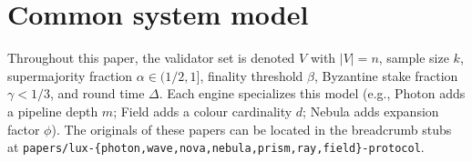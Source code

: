 \section*{Common system model}

Throughout this paper, the validator set is denoted $V$ with $|V| = n$,
sample size $k$, supermajority fraction $\alpha \in (1/2, 1]$, finality
threshold $\beta$, Byzantine stake fraction $\gamma < 1/3$, and round
time $\Delta$. Each engine specializes this model (e.g., Photon adds a
pipeline depth $m$; Field adds a colour cardinality $d$; Nebula adds
expansion factor $\phi$). The originals of these papers can be located
in the breadcrumb stubs at \texttt{papers/lux-\{photon,wave,nova,nebula,prism,ray,field\}-protocol}.
